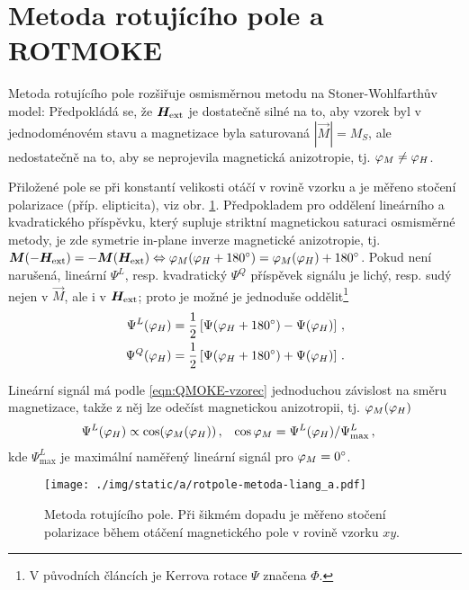 \section{Metoda rotujícího pole a ROTMOKE}
\label{chap:ROTMOKE}

Metoda rotujícího pole\cite{liangSeparationLinearQuadratic2015,liangQuantitativeStudyQuadratic2015} rozšiřuje osmisměrnou metodu na Stoner-Wohlfarthův model: Předpokládá se, že $\bm{H}_\textrm{ext}$ je dostatečně silné na to, aby vzorek byl v jednodoménovém stavu a magnetizace byla saturovaná $|\vec{M}|=M_S$, ale nedostatečně na to, aby se neprojevila magnetická anizotropie, tj. $\varphi_M\neq\varphi_H$.

Přiložené pole se při konstantí velikosti otáčí v rovině vzorku a je měřeno stočení polarizace (příp. elipticita), viz obr. \ref{fig:metoda-rotujiciho-pole}.
Předpokladem pro oddělení lineárního a kvadratického příspěvku, který supluje striktní magnetickou saturaci osmisměrné metody,
je zde symetrie in-plane inverze magnetické anizotropie, tj. $\bm{M}(-\bm{H}_\textrm{ext})=-\bm{M}(\bm{H}_\textrm{ext}) \Leftrightarrow \varphi_M(\varphi_H+\SI{180}{\degree})=\varphi_M(\varphi_H)+\SI{180}{\degree}$.
Pokud není narušená, lineární $\Psi^L$, resp. kvadratický $\Psi^Q$ příspěvek signálu je lichý, resp. sudý nejen v $\vec{M}$, ale i v $\bm{H}_\textrm{ext}$;
proto je možné je jednoduše oddělit\footnote{V původních článcích je Kerrova rotace $\Psi$ značena $\Phi$.}
\begin{subequations}
\label{eqn:rotmoke-separace}
\begin{align}
    \Psi^L(\varphi_H)&=\frac{1}{2} \left[ \Psi(\varphi_H+\SI{180}{\degree}) - \Psi(\varphi_H) \right] 
    \,, \\ \Psi^Q(\varphi_H)&=\frac{1}{2} \left[ \Psi(\varphi_H+\SI{180}{\degree}) + \Psi(\varphi_H) \right] \,.
\end{align}
\end{subequations}

Lineární signál má podle \eqref{eqn:QMOKE-vzorec} jednoduchou závislost na směru magnetizace, takže z něj lze odečíst magnetickou anizotropii, tj. $\varphi_M(\varphi_H)$
\begin{align}
    \label{eqn:rotmoke-anizotropie}
    \Psi^L(\varphi_H) &\propto \cos(\varphi_M(\varphi_H)) \,, & \cos \varphi_M &=\Psi^L(\varphi_H)/\Psi^L_\textrm{max} \,,
\end{align}
kde $\Psi^L_\textrm{max}$ je maximální naměřený lineární signál pro $\varphi_M=\SI{0}{\degree}$.

\begin{figure}[htbp]
    \centering
    \texttt{[image: ./img/static/a/rotpole-metoda-liang\_a.pdf]}
    \caption{Metoda rotujícího pole.
    Při šikmém dopadu je měřeno stočení polarizace během otáčení magnetického pole v rovině vzorku $xy$. \cite{liangQuantitativeStudyQuadratic2015}}
    \label{fig:metoda-rotujiciho-pole}
\end{figure}

